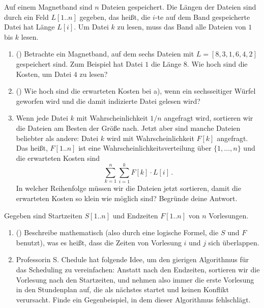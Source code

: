 \documentclass{uebung_cs}
\begin{document}
\begin{aufgabe}
    Auf einem Magnetband sind $n$ Dateien gespeichert.
    Die Längen der Dateien sind durch ein Feld $L[1..n]$ gegeben, das heißt, die $i$-te auf dem Band gespeicherte Datei hat Länge $L[i]$.
    Um Datei $k$ zu lesen, muss das Band alle Dateien von $1$ bis $k$ lesen.
    \begin{enumerate}
        \item(\warmup) Betrachte ein Magnetband, auf dem sechs Dateien mit $L=[8,3,1,6,4,2]$ gespeichert sind. Zum Beispiel hat Datei $1$ die Länge $8$.
        Wie hoch sind die Kosten, um Datei $4$ zu lesen?
        \item(\warmup) Wie hoch sind die erwarteten Kosten bei a), wenn ein sechsseitiger Würfel geworfen wird und die damit indizierte Datei gelesen wird?
        \item Wenn jede Datei $k$ mit Wahrscheinlichkeit $1/n$ angefragt wird, sortieren wir die Dateien am Besten der Größe nach. Jetzt aber sind manche Dateien beliebter als andere: Datei $k$ wird mit Wahrscheinlichkeit $F[k]$ angefragt. Das heißt, $F[1..n]$ ist eine Wahrscheinlichkeitsverteilung über $\{1,\dots,n\}$ und die erwarteten Kosten sind
          \[\sum_{k=1}^n \sum_{i=1}^k F[k]\cdot L[i]\,.\]
        In welcher Reihenfolge müssen wir die Dateien jetzt sortieren, damit die erwarteten Kosten so klein wie möglich sind? Begründe deine Antwort.
    \end{enumerate}
\end{aufgabe}

\begin{aufgabe}[Scheduling]
    Gegeben sind Startzeiten $S[1..n]$ und Endzeiten $F[1..n]$ von $n$ Vorlesungen.
    \begin{enumerate}
        \item(\warmup) Beschreibe mathematisch (also durch eine logische Formel, die $S$ und $F$ benutzt), was es heißt, dass die Zeiten von Vorlesung $i$ und $j$ sich überlappen.
        \item Professorin S. Chedule hat folgende Idee, um den gierigen Algorithmus für das Scheduling zu vereinfachen: Anstatt nach den Endzeiten, sortieren wir die Vorlesung nach den Startzeiten, und nehmen also immer die erste Vorlesung in den Stundenplan auf, die als nächstes startet und keinen Konflikt verursacht. Finde ein Gegenbeispiel, in dem dieser Algorithmus fehlschlägt.
    \end{enumerate}
\end{aufgabe}
\end{document}
